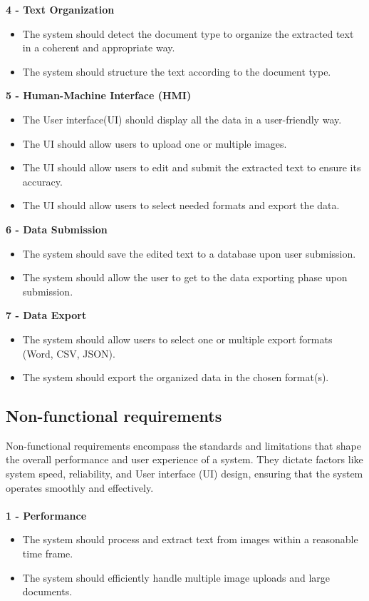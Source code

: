 \textbf{\large 4 - Text Organization  }
\begin{itemize}
    \item The system should detect the document type to organize the extracted text in a coherent and appropriate way.
    \item The system should structure the text according to the document type.
\end{itemize}
\vspace{5mm}
\textbf{\large 5 - Human-Machine Interface (HMI) }
\begin{itemize}
    \item The User interface(UI) should display all the data in a user-friendly way. 
    \item The UI should allow users to upload one or multiple images.
    \item The UI should allow users to edit and submit the extracted text to ensure its accuracy.
    \item The UI should allow users to select needed formats and export the data. 
\end{itemize}
\vspace{4mm}

\textbf{\large 6 - Data Submission }
\begin{itemize}
    \item The system should save the edited text to a database upon user submission.
    \item The system should allow the user to get to the data exporting phase upon submission.\\
\end{itemize}
\vspace{4mm}

\textbf{\large 7 - Data Export }
\begin{itemize}
    \item The system should allow users to select one or multiple export formats (Word, CSV, JSON).
    \item The system should export the organized data in the chosen format(s).
\end{itemize}
\vspace{4mm}

\subsection{Non-functional requirements}
Non-functional requirements encompass the standards and limitations that shape the overall performance and user experience of a system. They dictate factors like system speed, reliability, and User interface (UI) design, ensuring that the system operates smoothly and effectively.
\\\\
\textbf{\large 1 - Performance  }
\begin{itemize}
    \item The system should process and extract text from images within a reasonable time frame.
    \item The system should efficiently handle multiple image uploads and large documents.
\end{itemize}
\vspace{4mm}

